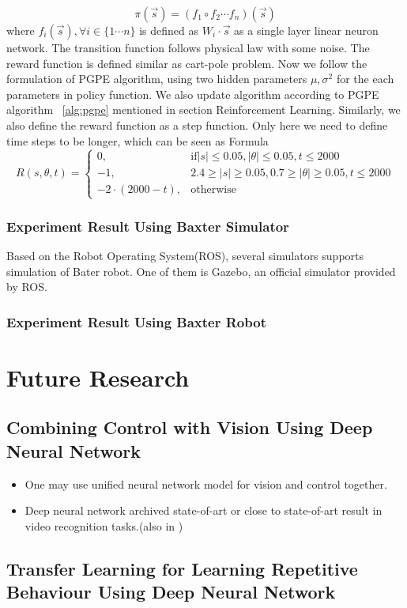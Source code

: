 \documentclass[officiallayout]{tktla}
\begin{document}
\begin{equation}
\pi(\vec{s}) = (f_1 \circ f_2 \cdots f_n)(\vec{s})
\end{equation} 
where $f_i(\vec{s}), \forall i \in \{1\cdots n\}$ is defined as $W_i \cdot \vec{s}$ as a single layer linear neuron network.
The transition function follows physical law with some noise. The reward function is defined similar as cart-pole problem.
Now we follow the formulation of PGPE algorithm, using two hidden parameters $\mu, \sigma^2$ for the each parameters in policy function. We also update algorithm according to PGPE algorithm ~\ref{alg:pgpe} mentioned in section Reinforcement Learning. Similarly, we also define the reward function as a step function. Only here we need to define time steps to be longer, which can be seen as Formula~
\begin{equation}
    R(s,\theta, t)= 
\begin{cases}
    0,				& \text{if} |s|\leq 0.05, |\theta| \leq 0.05, t \leq 2000\\
    -1,              & 2.4 \geq |s|\geq 0.05, 0.7 \geq |\theta| \geq 0.05, t \leq 2000 \\
    -2 \cdot (2000 - t), 		& \text{otherwise}
\end{cases}
\end{equation}

\subsection{Experiment Result Using Baxter Simulator}
Based on the Robot Operating System(ROS), several simulators supports simulation of Bater robot. One of them is Gazebo, an official simulator provided by ROS.
\subsection{Experiment Result Using Baxter Robot}

\chapter{Future Research}
\section{Combining Control with Vision Using Deep Neural Network}
\begin{itemize}
\item One may use unified neural network model for vision and control together.
\item Deep neural network archived state-of-art or close to state-of-art result in video recognition tasks.(also in )
\end{itemize}
\section{Transfer Learning for Learning Repetitive Behaviour Using Deep Neural Network}





\end{document}
